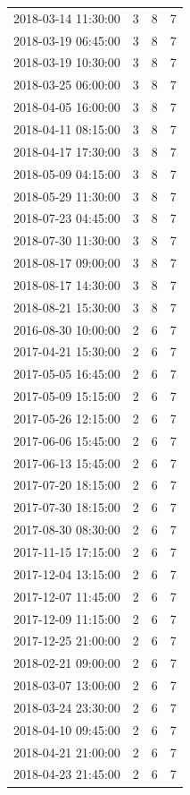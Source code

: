 \begin{tabular}{lrrr}
2018-03-14 11:30:00 & 3 & 8 & 7 \\
2018-03-19 06:45:00 & 3 & 8 & 7 \\
2018-03-19 10:30:00 & 3 & 8 & 7 \\
2018-03-25 06:00:00 & 3 & 8 & 7 \\
2018-04-05 16:00:00 & 3 & 8 & 7 \\
2018-04-11 08:15:00 & 3 & 8 & 7 \\
2018-04-17 17:30:00 & 3 & 8 & 7 \\
2018-05-09 04:15:00 & 3 & 8 & 7 \\
2018-05-29 11:30:00 & 3 & 8 & 7 \\
2018-07-23 04:45:00 & 3 & 8 & 7 \\
2018-07-30 11:30:00 & 3 & 8 & 7 \\
2018-08-17 09:00:00 & 3 & 8 & 7 \\
2018-08-17 14:30:00 & 3 & 8 & 7 \\
2018-08-21 15:30:00 & 3 & 8 & 7 \\
2016-08-30 10:00:00 & 2 & 6 & 7 \\
2017-04-21 15:30:00 & 2 & 6 & 7 \\
2017-05-05 16:45:00 & 2 & 6 & 7 \\
2017-05-09 15:15:00 & 2 & 6 & 7 \\
2017-05-26 12:15:00 & 2 & 6 & 7 \\
2017-06-06 15:45:00 & 2 & 6 & 7 \\
2017-06-13 15:45:00 & 2 & 6 & 7 \\
2017-07-20 18:15:00 & 2 & 6 & 7 \\
2017-07-30 18:15:00 & 2 & 6 & 7 \\
2017-08-30 08:30:00 & 2 & 6 & 7 \\
2017-11-15 17:15:00 & 2 & 6 & 7 \\
2017-12-04 13:15:00 & 2 & 6 & 7 \\
2017-12-07 11:45:00 & 2 & 6 & 7 \\
2017-12-09 11:15:00 & 2 & 6 & 7 \\
2017-12-25 21:00:00 & 2 & 6 & 7 \\
2018-02-21 09:00:00 & 2 & 6 & 7 \\
2018-03-07 13:00:00 & 2 & 6 & 7 \\
2018-03-24 23:30:00 & 2 & 6 & 7 \\
2018-04-10 09:45:00 & 2 & 6 & 7 \\
2018-04-21 21:00:00 & 2 & 6 & 7 \\
2018-04-23 21:45:00 & 2 & 6 & 7 \\

\end{tabular}
